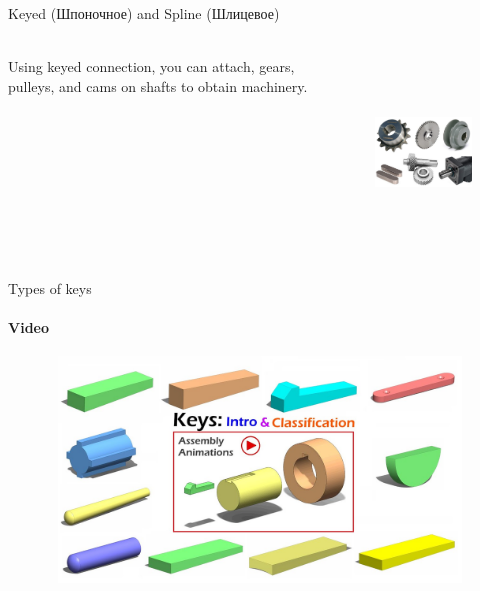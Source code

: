 \documentclass[aspectratio=169]{beamer}
\begin{document}
\begin{frame}[t]{Keyed (Шпоночное) and Spline (Шлицевое)}
    \framesubtitle{}
    \begin{columns}[T,onlytextwidth]
        \begin{column}{0.49\textwidth}
            Using keyed connection, you can attach, gears, pulleys, and cams on shafts to obtain machinery.
        \end{column}
        \begin{column}{0.49\textwidth}
            \begin{figure}[H]
                \centering\includegraphics[height=5cm,width=1\textwidth,keepaspectratio]{find_key.png}
                \label{fig:find_key.png}
            \end{figure}
        \end{column}
    \end{columns}
\end{frame}

\begin{frame}[t]{Types of keys}
    \framesubtitle{Video}
    \vspace{-0.6cm}
    \begin{figure}[H]
        \href{https://youtu.be/F3c6GPAFZMI}{
            \centering\includegraphics[height=6cm,width=1\textwidth,keepaspectratio]{keyed_video.jpg}}
        \label{fig:keyed_video.jpg}
    \end{figure}
\end{frame}
\end{document}
